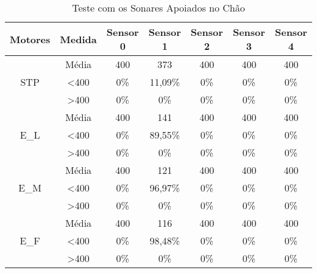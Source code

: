 \begin{table}[H]
\centering
\caption{Teste com os Sonares Apoiados no Chão}
\label{teste_2}
\begin{tabular}{|c|c|ccccc|}
\hline
\textbf{Motores}                & \textbf{Medida}  & \textbf{Sensor 0} & \textbf{Sensor 1} & \textbf{Sensor 2} & \textbf{Sensor 3} & \textbf{Sensor 4} \\ \hline
\multirow{3}{*}{STP}            & Média            & 400               & 373               & 400               & 400               & 400               \\
                                & \textless 400    & 0\%            & 11,09\%           & 0\%            & 0\%            & 0\%            \\
                                & \textgreater 400 & 0\%            & 0\%            & 0\%            & 0\%            & 0\%            \\ \hline
\multirow{3}{*}{E\_L}           & Média            & 400               & 141               & 400               & 400               & 400               \\
                                & \textless 400    & 0\%            & 89,55\%           & 0\%            & 0\%            & 0\%            \\
                                & \textgreater 400 & 0\%            & 0\%            & 0\%            & 0\%            & 0\%            \\ \hline
\multirow{3}{*}{E\_M}           & Média            & 400               & 121               & 400               & 400               & 400               \\
                                & \textless 400    & 0\%            & 96,97\%           & 0\%            & 0\%            & 0\%            \\
                                & \textgreater 400 & 0\%            & 0\%            & 0\%            & 0\%            & 0\%            \\ \hline
\multirow{3}{*}{E\_F}           & Média            & 400               & 116               & 400               & 400               & 400               \\
                                & \textless 400    & 0\%            & 98,48\%           & 0\%            & 0\%            & 0\%            \\
                                & \textgreater 400 & 0\%            & 0\%            & 0\%            & 0\%            & 0\%            \\ \hline

\end{tabular}
\end{table}
